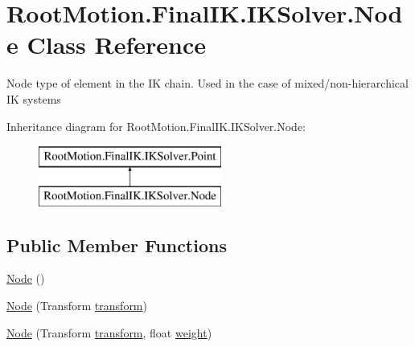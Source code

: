 \hypertarget{class_root_motion_1_1_final_i_k_1_1_i_k_solver_1_1_node}{}\section{Root\+Motion.\+Final\+I\+K.\+I\+K\+Solver.\+Node Class Reference}
\label{class_root_motion_1_1_final_i_k_1_1_i_k_solver_1_1_node}


Node type of element in the IK chain. Used in the case of mixed/non-\/hierarchical IK systems  


Inheritance diagram for Root\+Motion.\+Final\+I\+K.\+I\+K\+Solver.\+Node\+:\begin{figure}[H]
\begin{center}
\leavevmode
\includegraphics[height=2.000000cm]{class_root_motion_1_1_final_i_k_1_1_i_k_solver_1_1_node}
\end{center}
\end{figure}
\subsection*{Public Member Functions}
\begin{DoxyCompactItemize}
\item 
\mbox{\hyperlink{class_root_motion_1_1_final_i_k_1_1_i_k_solver_1_1_node_a5bf9b323694fea762ca57563d4188c10}{Node}} ()
\item 
\mbox{\hyperlink{class_root_motion_1_1_final_i_k_1_1_i_k_solver_1_1_node_aa23f32777ca6fbc85a879aa225b5f2ab}{Node}} (Transform \mbox{\hyperlink{class_root_motion_1_1_final_i_k_1_1_i_k_solver_1_1_point_a438b0ff2494f43dfe97c2a1578b1ee06}{transform}})
\item 
\mbox{\hyperlink{class_root_motion_1_1_final_i_k_1_1_i_k_solver_1_1_node_a372f9fefaa9d426f2262f7b272388b42}{Node}} (Transform \mbox{\hyperlink{class_root_motion_1_1_final_i_k_1_1_i_k_solver_1_1_point_a438b0ff2494f43dfe97c2a1578b1ee06}{transform}}, float \mbox{\hyperlink{class_root_motion_1_1_final_i_k_1_1_i_k_solver_1_1_point_a33184a0e0c8de5a15a1b0fc060f4e4fb}{weight}})
\end{DoxyCompactItemize}
